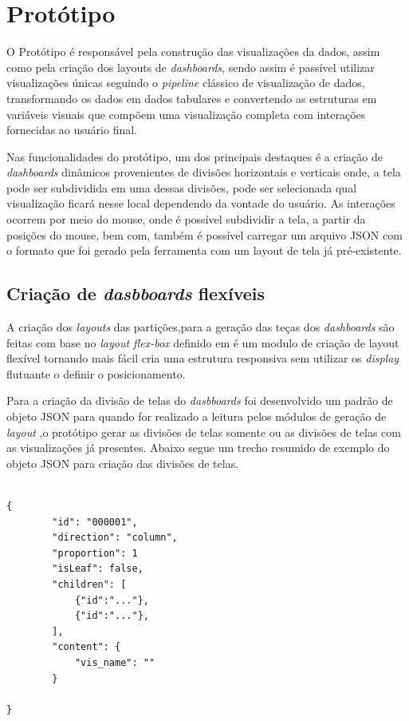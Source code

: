 \documentclass[
	12pt,				%
	openright,			%
	oneside,			%
	a4paper,			%
	english,			%
	brazil				%
	]{abntex2}
\begin{document}
\section{Protótipo}
O Protótipo é responsável pela construção das visualizações da dados, assim como pela criação dos layouts de  \textit{dashboards}, sendo assim é passível utilizar visualizações únicas seguindo o \textit{pipeline} clássico de visualização de dados, transformando os dados em dados tabulares e convertendo as estruturas em variáveis visuais que compõem uma visualização completa com interações fornecidas ao usuário final.  

Nas funcionalidades do protótipo, um dos principais destaques é a criação de \textit{dashboards} dinâmicos provenientes de divisões horizontais e verticais onde, a tela pode ser subdividida em uma dessas divisões, pode ser selecionada qual visualização ficará nesse local dependendo da vontade do usuário.
As interações ocorrem por meio do mouse, onde é possível subdividir a tela, a partir da posições do mouse, bem com, também é possível carregar um arquivo JSON com o formato que foi gerado pela ferramenta com um layout de tela já pré-existente.  

\subsection{Criação de \textit{dasbboards} flexíveis} 

A criação dos \textit{layouts} das partições,para a geração das teças dos \textit{dashboards} são feitas com base no \textit{layout flex-box} definido em \cite{w3c}
é um modulo de criação de layout flexível tornando mais fácil  cria uma estrutura responsiva sem utilizar os \textit{display} flutuante o definir o posicionamento.

Para a criação da divisão de telas do \textit{dasbboards} foi desenvolvido um padrão de objeto JSON para quando for realizado a leitura pelos módulos de geração de \textit{layout} ,o protótipo gerar as divisões de telas somente ou as divisões de telas com as visualizações já presentes. Abaixo segue um trecho resumido de exemplo do objeto JSON para criação das divisões de telas. 

\begin{verbatim}

{
        "id": "000001",
        "direction": "column",
        "proportion": 1
        "isLeaf": false,
        "children": [
            {"id":"..."},
            {"id":"..."},
        ],
        "content": {
            "vis_name": ""
        }
        
}
\end{verbatim}
\end{document}
